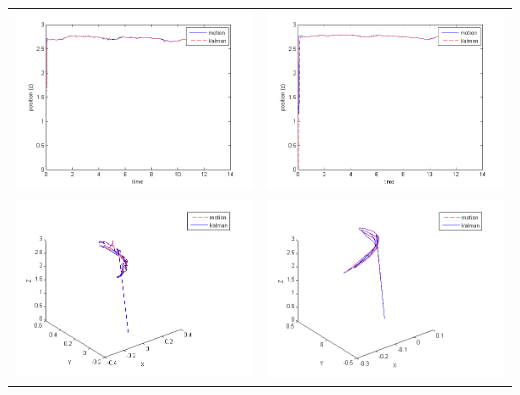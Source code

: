 \begin{center}
\begin{tabular}{cc}
        \includegraphics[width=.5\textwidth, height = 0.23\textheight, keepaspectratio]{fig/filter0-z.png} & \includegraphics[width=.5\textwidth, height = 0.23\textheight, keepaspectratio]{fig/filter3-z.png}\\
        \includegraphics[width=.5\textwidth, height = 0.23\textheight, keepaspectratio]{fig/filter0-xyz.png} & \includegraphics[width=.5\textwidth, height = 0.23\textheight, keepaspectratio]{fig/filter3-xyz.png}
    \end{tabular}
    \label{tab:no-filter-filter-kalman}
\end{center}
